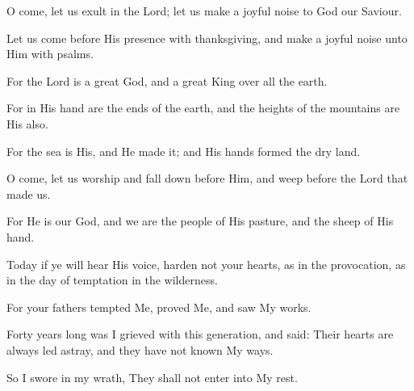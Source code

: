 O come, let us exult in the Lord; let us make a joyful noise to God our Saviour.

Let us come before His presence with thanksgiving, and make a joyful noise unto Him with psalms.

For the Lord is a great God, and a great King over all the earth.

For in His hand are the ends of the earth, and the heights of the mountains are His also.

For the sea is His, and He made it; and His hands formed the dry land.

O come, let us worship and fall down before Him, and weep before the Lord that made us.

For He is our God, and we are the people of His pasture, and the sheep of His hand.

Today if ye will hear His voice, harden not your hearts, as in the provocation, as in the day of temptation in the wilderness.

For your fathers tempted Me, proved Me, and saw My works.

Forty years long was I grieved with this generation, and said: Their hearts are always led astray, and they have not known My ways.

So I swore in my wrath, They shall not enter into My rest.
